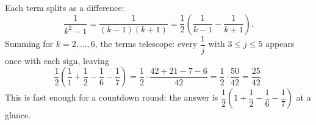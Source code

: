 Each term splits as a difference:
\[
\dfrac{1}{k^2-1}=\dfrac{1}{(k-1)(k+1)}=\dfrac{1}{2}\left(\dfrac{1}{k-1}-\dfrac{1}{k+1}\right).
\]
Summing for $k=2,\dots,6$, the terms telescope: every $\dfrac{1}{j}$ with $3\le j\le5$ appears once with each sign, leaving
\[
\dfrac{1}{2}\left(\dfrac{1}{1}+\dfrac{1}{2}-\dfrac{1}{6}-\dfrac{1}{7}\right)=\dfrac{1}{2}\cdot\dfrac{42+21-7-6}{42}=\dfrac{1}{2}\cdot\dfrac{50}{42}=\boxed{\dfrac{25}{42}}.
\]
This is fast enough for a countdown round: the answer is $\dfrac{1}{2}\left(1+\dfrac{1}{2}-\dfrac{1}{6}-\dfrac{1}{7}\right)$ at a glance.
